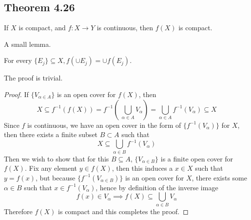 \documentclass[../../main.tex]{subfiles}
\begin{document}
\subsection{Theorem 4.26}
\begin{wts}
If $X$ is compact, and $f:X\to Y$ is continuous, then $f(X)$ is compact.
\end{wts}
A small lemma.
\begin{lemma}
For every $\{E_j\}\subseteq X, f(\cup E_j)=\cup f(E_j)$.
\end{lemma}
The proof is trivial.

\begin{proof}
If $\{V_{\alpha\in A}\}$ is an open cover for $f(X)$, then 
\[
X\subseteq f^{-1}(f(X))=f^{-1}\left(\:\bigcup_{\alpha\in A} V_\alpha\right) = \bigcup_{\alpha\in A}f^{-1}(V_\alpha)\subseteq X
\]
Since $f$ is continuous, we have an open cover in the form of $\{f^{-1}(V_\alpha)\}$ for $X$, then there exists a finite subset $B\subset A$ such that
\[
X\subseteq\bigcup_{\alpha\in B}f^{-1}(V_\alpha)
\]
Then we wish to show that for this $B\subseteq A$, $\{V_{\alpha\in B}\}$ is a finite open cover for $f(X)$. Fix any element $y\in f(X)$, then this induces a $x\in X$ such that $y=f(x)$, but because $\{f^{-1}(V_{\alpha\in B})\}$ is an open cover for $X$, there exists some $\alpha\in B$ such that $x\in f^{-1}(V_\alpha)$, hence by definition of the inverse image
\[
f(x)\in V_\alpha\implies f(X)\subseteq \bigcup_{\alpha\in B}V_\alpha
\]
Therefore $f(X)$ is compact and this completes the proof.
\end{proof}
\end{document}
